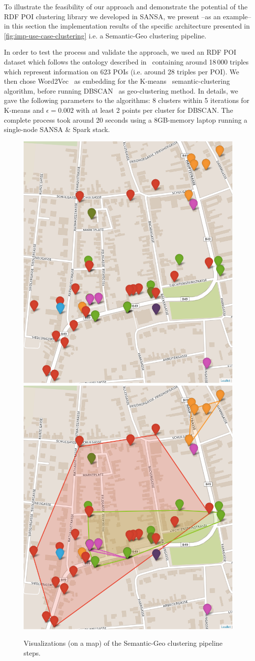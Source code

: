 To illustrate the feasibility of our approach and demonstrate the potential of the RDF POI clustering library we developed in SANSA, we present --as an example-- in this section the implementation results of the specific architecture presented in \autoref{fig:imp-use-case-clustering} i.e. a Semantic-Geo clustering pipeline.

In order to test the process and validate the approach, we used an RDF POI dataset which follows the ontology described in~\cite{Athanasiou2019BigPD} containing around 18\,000 triples which represent information on 623 POIs (i.e. around 28 triples per POI). We then chose Word2Vec~\cite{mikolov2013distributed} as embedding for the K-means~\cite{kmeans-algo} semantic-clustering algorithm, before running DBSCAN~\cite{ester1996density} as geo-clustering method. In details, we gave the following parameters to the algorithms: 8 clusters within 5 iterations for K-means and $\epsilon=0.002$ with at least 2 points per cluster for DBSCAN.
The complete process took around 20 seconds using a 8GB-memory laptop running a single-node SANSA \& Spark stack.

\begin{figure}
    \centering
    \includegraphics[width=.49\textwidth]{images/7_implemenation_and_usecases/kmean.png}
	\includegraphics[width=.49\textwidth]{images/7_implemenation_and_usecases/kmeandbscan.png}
    \caption{Visualizations (on a map) of the Semantic-Geo clustering pipeline steps.}
    \label{fig:imp-use-cases-map}
\end{figure}

